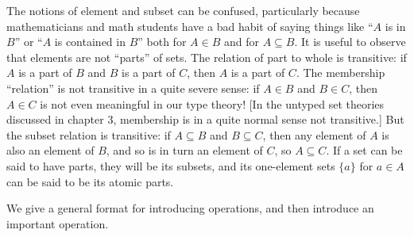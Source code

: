 \documentclass[12pt]{book}
\begin{document}
The notions of element and subset can be confused, particularly
because mathematicians and math students have a bad habit of saying things like ``$A$ is in $B$'' or
``$A$ is contained in $B$'' both  for $A \in B$ and for $A \subseteq B$.  It
is useful to observe that elements are not ``parts'' of sets.  The
relation of part to whole is transitive: if $A$ is a part of $B$ and
$B$ is a part of $C$, then $A$ is a part of $C$.  The membership
``relation'' is not transitive in a quite severe sense: if $A \in B$
and $B \in C$, then $A \in C$ is not even meaningful in our type
theory!  [In the untyped set theories discussed in chapter 3,
membership is in a quite normal sense not transitive.]  But the subset
relation is transitive: if $A \subseteq B$ and $B \subseteq C$, then
any element of $A$ is also an element of $B$, and so is in turn an
element of $C$, so $A \subseteq C$.  If a set can be said to have
parts, they will be its subsets, and its one-element sets $\{a\}$ for
$a \in A$ can be said to be its atomic parts.



We give a general format for introducing operations, and then
introduce an important operation.
\end{document}
